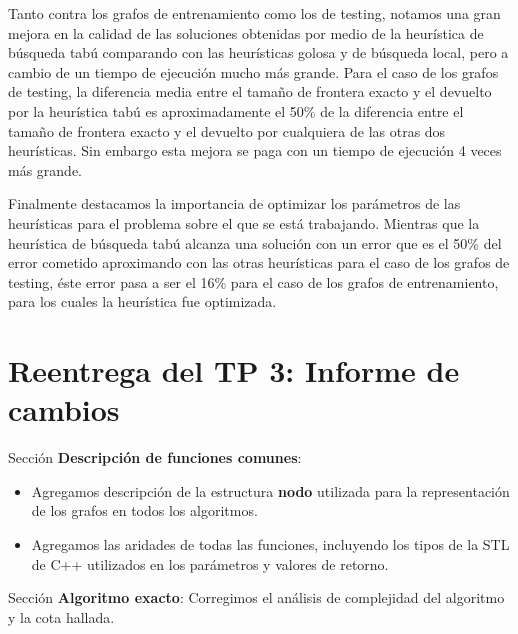 \documentclass[a4paper, 10pt, twoside]{article}
\begin{document}
Tanto contra los grafos de entrenamiento como los de testing, notamos una gran mejora en la calidad de las soluciones obtenidas por medio de la heurística de búsqueda tabú comparando con las heurísticas golosa y de búsqueda local, pero a cambio de un tiempo de ejecución mucho más grande. Para el caso de los grafos de testing, la diferencia media entre el tamaño de frontera exacto y el devuelto por la heurística tabú es aproximadamente el 50\% de la diferencia entre el tamaño de frontera exacto y el devuelto por cualquiera de las otras dos heurísticas. Sin embargo esta mejora se paga con un tiempo de ejecución 4 veces más grande.

Finalmente destacamos la importancia de optimizar los parámetros de las heurísticas para el problema sobre el que se está trabajando. Mientras que la heurística de búsqueda tabú alcanza una solución con un error que es el 50\% del error cometido aproximando con las otras heurísticas para el caso de los grafos de testing, éste error pasa a ser el 16\% para el caso de los grafos de entrenamiento, para los cuales la heurística fue optimizada. 






\newpage

\section{Reentrega del TP 3: Informe de cambios}

Sección \textbf{Descripción de funciones comunes}:

\begin{itemize}
	\item Agregamos descripción de la estructura \textbf{nodo} utilizada para la representación de los grafos en todos los algoritmos.

	\item Agregamos las aridades de todas las funciones, incluyendo los tipos de la STL de C++ utilizados en los parámetros y valores de retorno.
\end{itemize}

Sección \textbf{Algoritmo exacto}: Corregimos el análisis de complejidad del algoritmo y la cota hallada.
\end{document}
